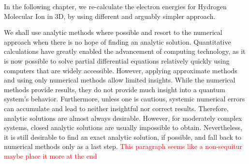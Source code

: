 In the following chapter, we re-calculate the electron energies for Hydrogen Molecular Ion in 3D, by using different and arguably simpler approach.

We shall use analytic methods where possible and resort to the numerical approach when there is no hope of finding an analytic solution.
Quantitative calculations have greatly enabled the advancement of computing technology, as it is now possible to solve partial differential equations relatively quickly using computers that are widely accessible.  However, applying approximate methods and using only numerical methods allow limited insights. While the numerical methods provide results, they do not provide much insight into a quantum system's behavior. Furthermore, unless one is cautious, systemic numerical errors can accumulate and lead to neither insightful nor correct results. Therefore, analytic solutions are almost always desirable. However, for moderately complex systems, closed analytic solutions are usually impossible to obtain. Nevertheless, it is still desirable to find an exact analytic solution,  if possible, and fall back to numerical methods only as a last step. \textcolor{red}{ This paragraph seems like a non-sequitur maybe place it more at the end}